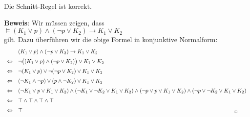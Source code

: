 \begin{Satz}
  Die Schnitt-Regel ist korrekt.
\end{Satz}
\textbf{Beweis}:  Wir müssen zeigen, dass \\[0.2cm]
\hspace*{1.3cm} $\models (K_1 \vee p) \wedge (\neg p \vee K_2) \rightarrow K_1 \vee K_2$ \\[0.2cm]
gilt.  Dazu überführen wir die obige Formel in konjunktive Normalform:
$$
\begin{array}{ll}
  & (K_1 \vee p) \wedge (\neg p \vee K_2) \rightarrow K_1 \vee K_2  \\[0.2cm]
\Leftrightarrow  & 
    \neg \bigl( (K_1 \vee p) \wedge (\neg p \vee K_2) \bigr) \vee K_1 \vee K_2 \\[0.2cm]
\Leftrightarrow  & 
    \neg (K_1 \vee p) \vee \neg (\neg p \vee K_2) \vee K_1 \vee K_2 \\[0.2cm]
\Leftrightarrow  & 
     (\neg K_1 \wedge \neg p) \vee  (p \wedge \neg K_2) \vee K_1 \vee K_2 \\[0.2cm]
\Leftrightarrow  & 
     (\neg K_1 \vee p \vee K_1 \vee K_2)  \wedge 
     (\neg K_1 \vee \neg K_2 \vee K_1 \vee K_2)  \wedge 
     (\neg p \vee p \vee K_1 \vee K_2)  \wedge 
     (\neg p \vee \neg K_2 \vee K_1 \vee K_2) 
      \\[0.2cm]
\Leftrightarrow  & 
     \verum  \wedge 
     \verum  \wedge 
     \verum  \wedge 
     \verum 
      \\[0.2cm]
\Leftrightarrow  & 
     \verum    \hspace*{13.5cm} _\Box
      \\
\end{array}
$$



